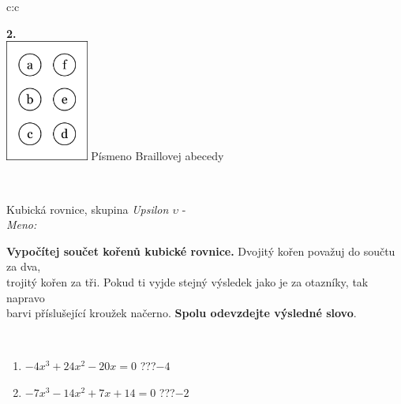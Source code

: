 \documentclass[10pt]{report}
\begin{document}
\begin{tabular}{c:c}
\begin{minipage}[c][104.5mm][t]{0.5\linewidth}
\begin{center}
\begin{minipage}{0.79\linewidth}
\begin{center}
\begin{varwidth}{\linewidth}
\begin{enumerate}
\end{enumerate}
\end{varwidth}
\end{center}
\end{minipage}
\begin{minipage}{0.20\linewidth}
\begin{center}
{\Huge\bfseries 2.} \\[2mm]
\includegraphics[height=40mm]{../images/braille.png}
{\small Písmeno Braillovej abecedy}
\end{center}
\end{minipage}
\end{center}
\end{minipage}
\\ \hdashline
\begin{minipage}[c][104.5mm][t]{0.5\linewidth}
\begin{center}
\vspace{7mm}
{\huge Kubická rovnice, skupina \textit{Upsilon $\upsilon$} -}\\[5mm]
\textit{Meno:}\phantom{xxxxxxxxxxxxxxxxxxxxxxxxxxxxxxxxxxxxxxxxxxxxxxxxxxxxxxxxxxxxxxxxx}\\[5mm]
\begin{minipage}{0.95\linewidth}
\textbf{Vypočítej součet kořenů kubické rovnice.} Dvojitý kořen považuj do součtu za dva,\\trojitý kořen za tři. Pokud ti vyjde stejný výsledek jako je za otazníky, tak napravo\\barvi příslušející kroužek načerno. \textbf{Spolu odevzdejte výsledné slovo}.
\end{minipage}
\\[1mm]
\begin{minipage}{0.79\linewidth}
\begin{center}
\begin{varwidth}{\linewidth}
\begin{enumerate}
\Large
\item $-4x^3+24x^2-20x=0$\quad \dotfill\; ???\;\dotfill \quad $-4$
\item $-7x^3-14x^2+7x+14=0$\quad \dotfill\; ???\;\dotfill \quad $-2$

\end{enumerate}
\end{varwidth}
\end{center}
\end{minipage}
\end{center}
\end{minipage}
\end{tabular}
\end{document}
